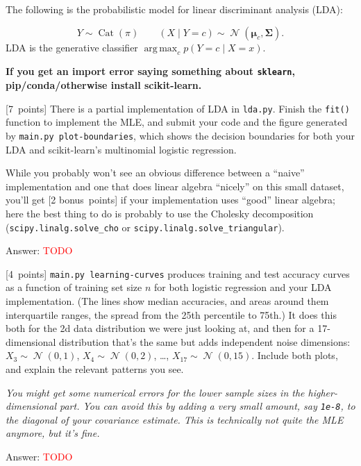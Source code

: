 \documentclass{article}
\newcommand{\ask}[1]{\textcolor{question}{#1}}
\newenvironment{answer}{\par\begingroup\color{answer}Answer: }{\endgroup}
\newcommand{\red}[1]{\textcolor{red}{#1}}
\newcommand{\pts}[1]{\textcolor{points}{[#1~points]}}
\newcommand{\meta}[1]{\textcolor{black!60!white}{\emph{#1}}}
\newcommand{\TODO}{\red{TODO}}
\DeclareMathOperator*{\argmax}{arg\,max}
\DeclareMathOperator{\Cat}{Cat}
\newcommand{\bSigma}{\boldsymbol{\Sigma}}
\newcommand{\bmu}{\boldsymbol{\mu}}
\DeclareMathOperator{\N}{\mathcal{N}}
\numberwithin{equation}{section}
\begin{document}
The following is the probabilistic model for linear discriminant analysis (LDA):

\[
    Y \sim \Cat(\pi)
    \qquad
    (X \mid Y = c) \sim \N(\bmu_c, \bSigma)
.\]
LDA is the generative classifier $\argmax_c p(Y = c \mid X = x)$.

\textbf{If you get an import error saying something about \texttt{sklearn}, pip/conda/otherwise install scikit-learn.}

\begin{qlist}
\item \pts{7}
There is a partial implementation of LDA in \texttt{lda.py}.
Finish the \texttt{fit()} function to implement the MLE,
and \ask{submit your code and the figure generated by \texttt{main.py plot-boundaries}},
which shows the decision boundaries for both your LDA and scikit-learn's multinomial logistic regression.

While you probably won't see an obvious difference between a ``naive'' implementation
and one that does linear algebra ``nicely'' on this small dataset,
you'll get \pts{2 bonus} if your implementation uses ``good'' linear algebra;
here the best thing to do is probably to use the Cholesky decomposition
(\texttt{scipy.linalg.solve\_cho} or \texttt{scipy.linalg.solve\_triangular}).
\begin{answer}\TODO\end{answer}

\item \pts{4}
\texttt{main.py learning-curves} produces training and test accuracy curves as a function of training set size $n$
for both logistic regression and your LDA implementation.
(The lines show median accuracies, and areas around them interquartile ranges, the spread from the 25th percentile to 75th.)
It does this both for the 2d data distribution we were just looking at,
and then for a 17-dimensional distribution
that's the same but adds independent noise dimensions:
$X_3 \sim \N(0, 1)$,
$X_4 \sim \N(0, 2)$, \dots,
$X_{17} \sim \N(0, 15)$.
\ask{Include both plots, and explain the relevant patterns you see.}

\meta{You might get some numerical errors for the lower sample sizes in the higher-dimensional part. You can avoid this by adding a very small amount, say \texttt{1e-8}, to the diagonal of your covariance estimate. This is technically not quite the MLE anymore, but it's fine.}

\begin{answer}\TODO\end{answer}
\end{qlist}
\end{document}
